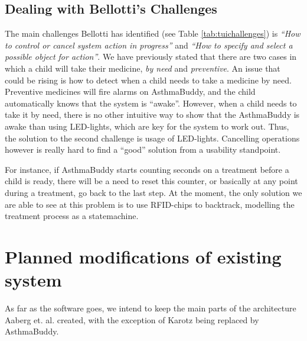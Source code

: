 \subsection{Dealing with Bellotti's Challenges}
\label{sec:handling-challenges}
The main challenges Bellotti has identified (see Table \ref{tab:tuichallenges}) is \emph{``How to control or cancel system action in progress''} and \emph{``How to specify and select a possible object for action''}. We have previously stated that there are two cases in which a child will take their medicine, \emph{by need} and \emph{preventive}. An issue that could be rising is how to detect when a child needs to take a medicine by need. Preventive medicines will fire alarms on AsthmaBuddy, and the child automatically knows that the system is ``awake''. However, when a child needs to take it by need, there is no other intuitive way to show that the AsthmaBuddy is awake than using LED-lights, which are key for the system to work out. Thus, the solution to the second challenge is usage of LED-lights. Cancelling operations however is really hard to find a ``good'' solution from a usability standpoint. 

For instance, if AsthmaBuddy starts counting seconds on a treatment before a child is ready, there will be a need to reset this counter, or basically at any point during a treatment, go back to the last step. At the moment, the only solution we are able to see at this problem is to use RFID-chips to backtrack, modelling the treatment process as a statemachine. 



\section{Planned modifications of existing system}
As far as the software goes, we intend to keep the main parts of the architecture Aaberg et. al. created, with the exception of Karotz being replaced by AsthmaBuddy. 



